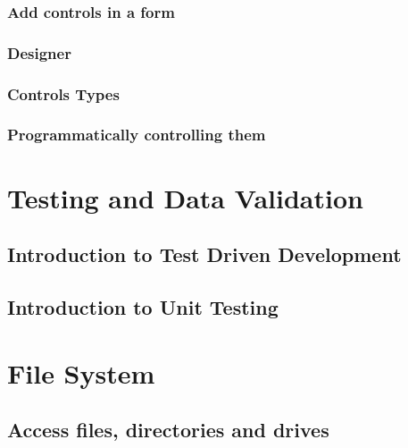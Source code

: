 \documentclass[
]{book}
\begin{document}
\hypertarget{add-controls-in-a-form}{%
\subsection{Add controls in a form}\label{add-controls-in-a-form}}

\hypertarget{designer}{%
\subsection{Designer}\label{designer}}

\hypertarget{controls-types}{%
\subsection{Controls Types}\label{controls-types}}

\hypertarget{programmatically-controlling-them}{%
\subsection{Programmatically controlling them}\label{programmatically-controlling-them}}

\hypertarget{testing-and-data-validation}{%
\chapter{Testing and Data Validation}\label{testing-and-data-validation}}

\hypertarget{introduction-to-test-driven-development}{%
\section{Introduction to Test Driven Development}\label{introduction-to-test-driven-development}}

\hypertarget{introduction-to-unit-testing}{%
\section{Introduction to Unit Testing}\label{introduction-to-unit-testing}}

\hypertarget{file-system}{%
\chapter{File System}\label{file-system}}

\hypertarget{access-files-directories-and-drives}{%
\section{Access files, directories and drives}\label{access-files-directories-and-drives}}
\end{document}
